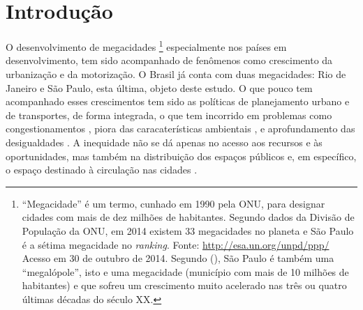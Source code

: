 \chapter[Introdução]{Introdução}



O desenvolvimento de megacidades
\footnote{``Megacidade'' é um termo, cunhado em 1990 pela ONU, para designar cidades com mais de dez milhões de habitantes. Segundo dados da Divisão de População da ONU, em 2014 existem 33 megacidades no planeta e São Paulo é a sétima megacidade no \emph{ranking}. Fonte: \url{http://esa.un.org/unpd/ppp/} Acesso em 30 de outubro de 2014.
Segundo  (\citeyear{FREITAG2007}), São Paulo é também uma ``megalópole'', isto e uma megacidade (município com mais de 10 milhões de habitantes) e que sofreu um crescimento muito acelerado nas três ou quatro últimas décadas do século XX.}
%
especialmente nos países em desenvolvimento, tem sido acompanhado de fenômenos como crescimento da urbanização e da motorização. O Brasil já conta com duas megacidades: Rio de Janeiro e São Paulo, esta última, objeto deste estudo.
O que pouco tem acompanhado esses crescimentos tem sido as políticas de planejamento urbano e de transportes, de forma integrada, o que tem incorrido em problemas como congestionamentos \cite{KINGHAM2001,STENG2005,METZ2012}, piora das caracaterísticas ambientais \cite{TERTOOLEN1998,RICHARDSON2005,BANISTER2011}, e aprofundamento das desigualdades \cite{HODGE1995,AHMED2008,LEWIS2011}.
A inequidade não se dá apenas no acesso aos recursos e às oportunidades, mas também na distribuição dos espaços públicos \cite{ALVA1997} e, em específico, o espaço destinado à circulação nas cidades \cite{VASCONCELLOS2012}.

